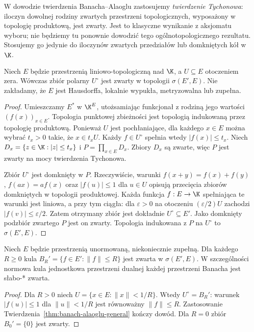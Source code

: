 \begin{uwaga}
W dowodzie twierdzenia Banacha--Alaoglu zastosujemy \emph{twierdzenie
Tychonowa}: iloczyn dowolnej rodziny zwartych przestrzeni topologicznych,
wyposażony w topologię produktową, jest zwarty. Jest to klasyczne
wynikanie z aksjomatu wyboru; nie będziemy tu ponownie dowodzić
tego ogólnotopologicznego rezultatu. Stosujemy go jedynie do iloczynów
zwartych przedziałów lub domkniętych kół w $\K$.
\end{uwaga}

\begin{twierdzenie}\label{thm:banach-alaoglu-general}
Niech $E$ będzie przestrzenią liniowo-topologiczną nad $\K$, a
$U\subseteq E$ otoczeniem zera. Wówczas zbiór polarny $U^\circ$
jest zwarty w topologii $\sigma(E',E)$.
Nie zakładamy, że $E$ jest Hausdorffa, lokalnie wypukła, metryzowalna
lub zupełna.
\end{twierdzenie}
\begin{proof}
Umieszczamy $E^*$ w $\K^E$, utożsamiając funkcjonał z rodziną
jego wartości $(f(x))_{x\in E}$. Topologia punktowej zbieżności
jest topologią indukowaną przez topologię produktową.
Ponieważ $U$ jest pochłaniające, dla każdego $x\in E$ można wybrać
$t_x>0$ takie, że $x\in t_xU$. Każdy $f\in U^\circ$ spełnia wtedy
$|f(x)|\le t_x$. Niech $D_x=\{z\in\K:|z|\le t_x\}$ i
$P=\prod_{x\in E}D_x$. Zbiory $D_x$ są zwarte, więc $P$ jest zwarty
na mocy twierdzenia Tychonowa.

Zbiór $U^\circ$ jest domknięty w $P$. Rzeczywiście, warunki
$f(x+y)=f(x)+f(y)$, $f(ax)=af(x)$ oraz $|f(u)|\le1$ dla $u\in U$
opisują przecięcia zbiorów domkniętych w topologii produktowej.
Każda funkcja $f:E\to\K$ spełniająca te warunki jest liniowa,
a przy tym ciągła: dla $\varepsilon>0$ na otoczeniu
$(\varepsilon/2)U$ zachodzi $|f(v)|\le\varepsilon/2$.
Zatem otrzymany zbiór jest dokładnie $U^\circ\subseteq E'$.
Jako domknięty podzbiór zwartego $P$ jest on zwarty. Topologia
indukowana z $P$ na $U^\circ$ to $\sigma(E',E)$.
\end{proof}

\begin{wniosek}\label{cor:alaoglu-norm}
Niech $E$ będzie przestrzenią unormowaną, niekoniecznie zupełną.
Dla każdego $R\ge0$ kula
$B_R'=\{f\in E':\|f\|\le R\}$ jest zwarta w $\sigma(E',E)$.
W szczególności normowa kula jednostkowa przestrzeni dualnej
każdej przestrzeni Banacha jest słabo-* zwarta.
\end{wniosek}
\begin{proof}
Dla $R>0$ niech $U=\{x\in E:\|x\|<1/R\}$.
Wtedy $U^\circ=B_R'$: warunek $|f(u)|\le1$ dla $\|u\|<1/R$
jest równoważny $\|f\|\le R$. Zastosowanie
Twierdzenia~\ref{thm:banach-alaoglu-general} kończy dowód.
Dla $R=0$ zbiór $B_0'=\{0\}$ jest zwarty.
\end{proof}

